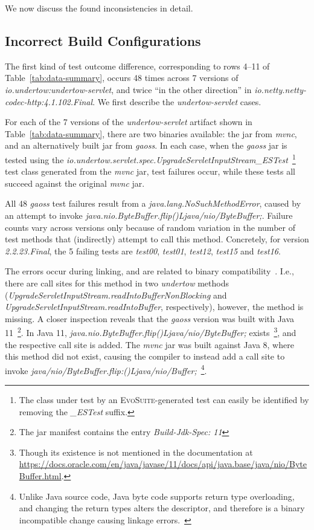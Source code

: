 \documentclass[conference]{IEEEtran}
\makeatletter
\newcommand{\evosuite}{\textsc{EvoSuite}\@\xspace}
\makeatother
\begin{document}
We now discuss the found inconsistencies in detail.

\subsection{Incorrect Build Configurations}


The first kind of test outcome difference, corresponding to rows 4--11 of Table~\ref{tab:data-summary}, occurs 48 times across 7 versions of \textit{io.undertow:undertow-servlet}, and twice ``in the other direction'' in \textit{io.netty.netty-codec-http:4.1.102.Final}.
We first describe the \textit{undertow-servlet} cases.

For each of the 7 versions of the \textit{undertow-servlet} artifact shown in Table~\ref{tab:data-summary}, there are two binaries available: the jar from \textit{mvnc}, and an alternatively built jar from \textit{gaoss}. In each case, when the \textit{gaoss} jar is tested using the \textit{io.under\-tow.\-servlet.\-spec.UpgradeServletInputStream\_ESTest}~\footnote{The class under test by an \evosuite-generated test can easily be identified by removing the \textit{\_ESTest} suffix.} test class generated from the \textit{mvnc} jar, test failures occur, while these tests all succeed against the original \textit{mvnc} jar.

All 48 \textit{gaoss} test failures result from a \textit{java.lang.NoSuchMethodError}, caused by an attempt to invoke \textit{java.nio.ByteBuffer.flip()Ljava/nio/ByteBuffer;}.
Failure counts vary across versions only because of random variation in the number of test methods that (indirectly) attempt to call this method.
Concretely, for version \textit{2.2.23.Final}, the 5 failing tests are \textit{test00}, \textit{test01}, \textit{test12}, \textit{test15} and \textit{test16}.

The errors occur during linking, and are related to binary compatibility~\cite{JVM17Spec}. I.e., there are call sites for this method in two \textit{undertow} methods (\textit{UpgradeServletInputStream.readIntoBufferNonBlocking} and \textit{UpgradeServletInputStream.readIntoBuffer}, respectively), however, the method is missing. 
A closer inspection reveals that the \textit{gaoss} version was built with Java 11~\footnote{The jar manifest contains the entry \textit{Build-Jdk-Spec: 11}}. In Java 11, \textit{java.nio.ByteBuffer.flip()Ljava/nio/ByteBuffer;} exists~\footnote{Though its existence is not mentioned in the documentation at \url{https://docs.oracle.com/en/java/javase/11/docs/api/java.base/java/nio/ByteBuffer.html}.}, and the respective call site is added. The \textit{mvnc} jar was built against Java 8, where this method did not exist, causing the compiler to instead add a call site to invoke \textit{java/nio/ByteBuffer.flip:()Ljava/nio/Buffer;}~\footnote{Unlike Java source code, Java byte code supports return type overloading, and changing the return types alters the descriptor, and therefore is a binary incompatible change causing linkage errors.~\cite{JVM17Spec,dietrich2014broken}}.
\end{document}
